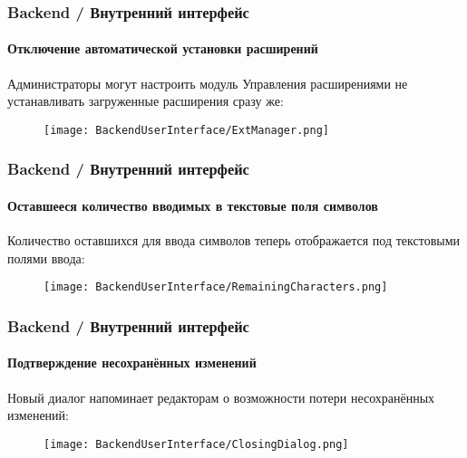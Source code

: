 \begin{frame}[fragile]
	\frametitle{Backend / Внутренний интерфейс}
	\framesubtitle{Отключение автоматической установки расширений}

	Администраторы могут настроить модуль Управления расширениями не устанавливать
	 загруженные расширения сразу же:

	\begin{figure}
		\texttt{[image: BackendUserInterface/ExtManager.png]}
	\end{figure}

\end{frame}

\begin{frame}[fragile]
	\frametitle{Backend / Внутренний интерфейс}
	\framesubtitle{Оставшееся количество вводимых в текстовые поля символов}

	Количество оставшихся для ввода символов теперь отображается под текстовыми полями ввода:

	\begin{figure}
		\texttt{[image: BackendUserInterface/RemainingCharacters.png]}
	\end{figure}

\end{frame}

\begin{frame}[fragile]
	\frametitle{Backend / Внутренний интерфейс}
	\framesubtitle{Подтверждение несохранённых изменений}

	Новый диалог напоминает редакторам о возможности потери несохранённых изменений:

	\begin{figure}
		\texttt{[image: BackendUserInterface/ClosingDialog.png]}
	\end{figure}

\end{frame}

